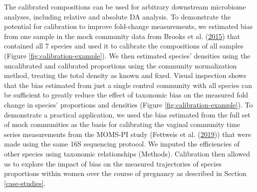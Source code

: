 \documentclass[
]{article}
\begin{document}
The calibrated compositions can be used for arbitrary downstream microbiome analyses, including relative and absolute DA analysis.
To demonstrate the potential for calibration to improve fold-change measurements, we estimated bias from one sample in the mock community data from Brooks et al. (\protect\hyperlink{ref-brooks2015thet}{2015}) that contained all 7 species and used it to calibrate the compositions of all samples (Figure \ref{fig:calibration-example}).
We then estimated species' densities using the uncalibrated and calibrated proportions using the community normalization method, treating the total density as known and fixed.
Visual inspection shows that the bias estimated from just a single control community with all species can be sufficient to greatly reduce the effect of taxonomic bias on the measured fold change in species' proportions and densities (Figure \ref{fig:calibration-example}).
To demonstrate a practical application, we used the bias estimated from the full set of mock communities as the basis for calibrating the vaginal community time series measurements from the MOMS-PI study (Fettweis et al. (\protect\hyperlink{ref-fettweis2019thev}{2019})) that were made using the same 16S sequencing protocol.
We imputed the efficiencies of other species using taxonomic relationships (Methods).
Calibration then allowed us to explore the impact of bias on the measured trajectories of species proportions within women over the course of pregnancy as described in Section \ref{case-studies}.
\end{document}
